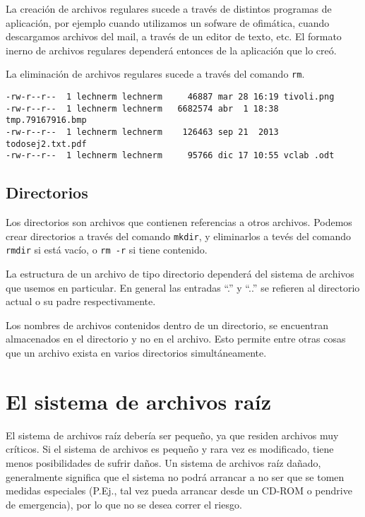 \documentclass[12pt]{article}
\begin{document}
La creación de archivos regulares sucede a través de distintos programas de 
aplicación, por ejemplo cuando utilizamos un sofware de ofimática, cuando 
descargamos archivos del mail, a través de un editor de texto, etc. El formato 
inerno de archivos regulares dependerá entonces de la aplicación que lo creó. 

La eliminación de archivos regulares sucede a través del comando \texttt{rm}. 

\begin{verbatim}
-rw-r--r--  1 lechnerm lechnerm     46887 mar 28 16:19 tivoli.png
-rw-r--r--  1 lechnerm lechnerm   6682574 abr  1 18:38 tmp.79167916.bmp
-rw-r--r--  1 lechnerm lechnerm    126463 sep 21  2013 todosej2.txt.pdf
-rw-r--r--  1 lechnerm lechnerm     95766 dic 17 10:55 vclab .odt
\end{verbatim}

\subsection*{Directorios}
Los directorios son archivos que contienen referencias a otros archivos. 
Podemos crear directorios a través del comando \texttt{mkdir}, y eliminarlos
a tevés del comando \texttt{rmdir} si está vacío, o \texttt{rm -r} si tiene 
contenido. 

La estructura de un archivo de tipo directorio dependerá del sistema de 
archivos que usemos en particular. En general las entradas ``.'' y ``..''
se refieren al directorio actual o su padre respectivamente.  

Los nombres de archivos contenidos dentro de un directorio, se encuentran 
almacenados en el directorio y no en el archivo. Esto permite entre otras
cosas que un archivo exista en varios directorios simultáneamente. 

\section{ El sistema de archivos raíz}

 El sistema de archivos raíz debería ser pequeño, ya que residen archivos
muy críticos. Si el sistema de archivos es pequeño y rara vez es modificado,
tiene menos posibilidades de sufrir daños. Un sistema de archivos raíz dañado,
generalmente significa que el sistema no podrá arrancar a no ser que se tomen
medidas especiales (P.Ej., tal vez pueda arrancar desde un CD-ROM o pendrive de
emergencia), por lo que no se desea correr el riesgo.  
\end{document}
